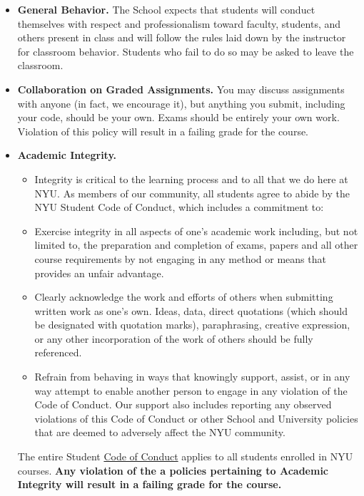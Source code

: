 \documentclass[12pt,pdftex,twoside,letterpaper]{exam}
\begin{document}
\begin{itemize}
  \item \textbf{General Behavior.} The School expects that students will conduct themselves with
        respect and professionalism toward faculty, students, and others present in class and will
        follow the rules laid down by the instructor for classroom behavior.  Students who fail to
        do so may be asked to leave the classroom.

  \item \textbf{Collaboration on Graded Assignments.} You may discuss assignments with anyone
        (in fact, we encourage it), but anything you submit, including your code, should be your
        own. Exams should be entirely your own work. Violation of this policy will result in a
        failing grade for the course.

  \item \textbf{Academic Integrity.}

  \begin{itemize}
    \item Integrity is critical to the learning process and to all that we do here at NYU. As
          members of our community, all students agree to abide by the NYU Student Code of Conduct,
          which includes a commitment to:
    \item Exercise integrity in all aspects of one's academic work including, but not limited to,
          the preparation and completion of exams, papers and all other course requirements by not
          engaging in any method or means that provides an unfair advantage.
    \item Clearly acknowledge the work and efforts of others when submitting written work as one's
          own. Ideas, data, direct quotations (which should be designated with quotation marks),
          paraphrasing, creative expression, or any other incorporation of the work of others
          should be fully referenced.
    \item Refrain from behaving in ways that knowingly support, assist, or in any way attempt to
          enable another person to engage in any violation of the Code of Conduct. Our support also
          includes reporting any observed violations of this Code of Conduct or other School and
          University policies that are deemed to adversely affect the NYU community.
  \end{itemize}

  The entire Student \href{https://www.nyu.edu/about/policies-guidelines-compliance/compliance/code-of-ethical-conduct.html}{Code of Conduct}
  applies to all students enrolled in NYU courses. \textbf{Any violation of the a policies
  pertaining to Academic Integrity will result in a failing grade for the course.}
\end{itemize}
\end{document}
